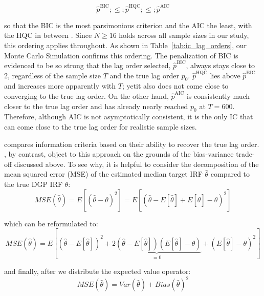\documentclass[12pt, a4paper]{article}
\begin{document}
\begin{equation} \label{eq:IC_comp}
\hat{p}^{\mathrm{BIC}} ;\leq; \hat{p}^{\mathrm{HQC}} ;\leq; \hat{p}^{\mathrm{AIC}}
\end{equation}

so that the BIC is the most parsimonious criterion and the AIC the least, with the HQC in between \citep{ivanovPractitionersGuideLag2005}. Since $N \ge 16$ holds across all sample sizes in our study, this ordering applies throughout. As shown in Table~\ref {tab:ic_lag_orders}, our Monte Carlo Simulation confirms this ordering. The penalization of BIC is evidenced to be so strong that the lag order selected, $\hat{p}^{\mathrm{BIC}}$, always stays close to 2, regardless of the sample size $T$ and the true lag order $p_0$. $\hat{p}^{\mathrm{HQC}}$ lies above $\hat{p}^{\mathrm{BIC}}$ and increases more apparently with $T$; yetit also does not come close to converging to the true lag order. On the other hand, $\hat{p}^{\mathrm{AIC}}$ is consistently much closer to the true lag order and has already nearly reached $p_0$ at $T=600$. Therefore, although AIC is not asymptotically consistent, it is the only IC that can come close to the true lag order for realistic sample sizes.



\citet{lutkepohlComparisonCriteriaEstimating1985} compares information criteria based on their ability to recover the true lag order. \citet{ivanovPractitionersGuideLag2005}, by contrast, object to this approach on the grounds of the bias-variance trade-off discussed above. To see why, it is helpful to consider the decomposition of the mean squared error (MSE) of the estimated median target IRF $\hat \theta$ compared to the true DGP IRF $\theta$:
\begin{equation} \label{eq:MSE}
MSE(\hat \theta) = E[(\hat \theta - \theta)^2] = E[(\hat \theta - E[\hat \theta] + E[\hat \theta] - \theta)^{2}]
\end{equation}

which can be reformulated to:
\begin{equation} \label{eq:MSE2}
MSE(\hat \theta) = E \left[ \left(\hat \theta - E[\hat \theta] \right)^{2} + \underbrace{2\left(\hat \theta - E[\hat \theta] \right)\left(E[\hat\theta]-\theta\right)}_{= 0} + \left(E[\hat\theta]-\theta \right)^{2} \right]
\end{equation}

and finally, after we distribute the expected value operator:
\begin{equation} \label{eq:MSE3}
MSE(\hat \theta) = Var(\hat \theta) + Bias(\hat\theta)^{2}
\end{equation}
\end{document}
